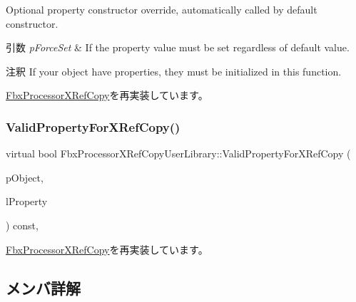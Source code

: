 Optional property constructor override, automatically called by default constructor. 
\begin{DoxyParams}{引数}
{\em p\+Force\+Set} & If the property value must be set regardless of default value. \\
\hline
\end{DoxyParams}
\begin{DoxyRemark}{注釈}
If your object have properties, they must be initialized in this function. 
\end{DoxyRemark}


\hyperlink{class_fbx_processor_x_ref_copy_afccc4a20df6bee60d5ce2a7a9ca11666}{Fbx\+Processor\+X\+Ref\+Copy}を再実装しています。

\mbox{\label{class_fbx_processor_x_ref_copy_user_library_a65545232dad661700a6c43e90530b3a6}} 
\subsubsection{\texorpdfstring{Valid\+Property\+For\+X\+Ref\+Copy()}{ValidPropertyForXRefCopy()}}
{\footnotesize\ttfamily virtual bool Fbx\+Processor\+X\+Ref\+Copy\+User\+Library\+::\+Valid\+Property\+For\+X\+Ref\+Copy (\begin{DoxyParamCaption}\item[{\hyperlink{class_fbx_object}{Fbx\+Object} $\ast$}]{p\+Object,  }\item[{\hyperlink{class_fbx_property}{Fbx\+Property} \&}]{l\+Property }\end{DoxyParamCaption}) const\hspace{0.3cm}{\ttfamily [protected]}, {\ttfamily [virtual]}}



\hyperlink{class_fbx_processor_x_ref_copy_a528c9b217f22eb04f68d3687774a18fd}{Fbx\+Processor\+X\+Ref\+Copy}を再実装しています。



\subsection{メンバ詳解}
\mbox{\label{class_fbx_processor_x_ref_copy_user_library_a8adc7c6c058547ca3ec8ea4e3589f25e}} 
